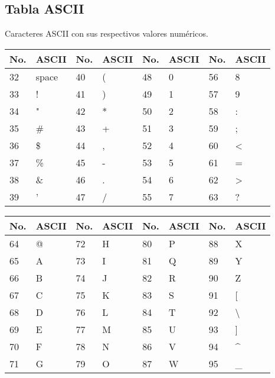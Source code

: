 \documentclass[10pt,landscape,twocolumn,letterpaper,twosided]{article}
\begin{document}
		\subsection{Tabla ASCII}
			Caracteres ASCII con sus respectivos valores numéricos.
			\begin{table}[H]
				\begin{tabular}{|l|l|l|l|l|l|l|l|}
					\hline \textbf{No.} & \textbf{ASCII} & \textbf{No.} & \textbf{ASCII}  &
						\textbf{No.} & \textbf{ASCII} & \textbf{No.} & \textbf{ASCII} \\ \hline
					32 & space & 40 & ( & 48 & 0 & 56 & 8 \\ \hline
					33 &  ! & 41 & ) & 49 & 1 & 57 & 9 \\ \hline
					34 &  " & 42 & * & 50 & 2 & 58 & : \\ \hline
					35 & \# & 43 & + & 51 & 3 & 59 & ; \\ \hline
					36 & \$ & 44 & , & 52 & 4 & 60 & < \\ \hline
					37 & \% & 45 & - & 53 & 5 & 61 & = \\ \hline
					38 & \& & 46 & . & 54 & 6 & 62 & > \\ \hline
					39 &  ' & 47 & / & 55 & 7 & 63 & ? \\ \hline
				\end{tabular}
			\end{table}
		
			\begin{tabular}{|l|l|l|l|l|l|l|l|}
				\hline \textbf{No.} & \textbf{ASCII} & \textbf{No.} & \textbf{ASCII}  &
					\textbf{No.} & \textbf{ASCII} & \textbf{No.} & \textbf{ASCII} \\ \hline
				64 & @ & 72 & H & 80 & P & 88 & X \\ \hline
				65 & A & 73 & I & 81 & Q & 89 & Y \\ \hline
				66 & B & 74 & J & 82 & R & 90 & Z \\ \hline
				67 & C & 75 & K & 83 & S & 91 & [ \\ \hline
				68 & D & 76 & L & 84 & T & 92 & \textbackslash \\ \hline
				69 & E & 77 & M & 85 & U & 93 & ] \\ \hline
				70 & F & 78 & N & 86 & V & 94 & \textasciicircum \\ \hline
				71 & G & 79 & O & 87 & W & 95 & \_ \\ \hline
			\end{tabular}
		
\end{document}
